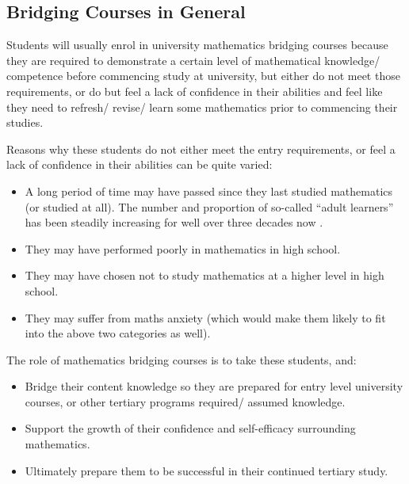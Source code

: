 \documentclass[twoside,12pt,a4paper]{report}
\begin{document}
\subsection{Bridging Courses in General}

Students will usually enrol in university mathematics bridging courses because they are required to demonstrate a certain level of mathematical knowledge/ competence before commencing study at university, but either do not meet those requirements, or do but feel a lack of confidence in their abilities and feel like they need to refresh/ revise/ learn some mathematics prior to commencing their studies.

Reasons why these students do not either meet the entry requirements, or feel a lack of confidence in their abilities can be quite varied:
\begin{itemize}
	\item A long period of time may have passed since they last studied mathematics (or studied at all). The number and proportion of so-called ``adult learners'' has been steadily increasing for well over three decades now \cite{Johnson2016, Hardin2008,Murtaugh1999}.
	\item They may have performed poorly in mathematics in high school.
	\item They may have chosen not to study mathematics at a higher level in high school.
	\item They may suffer from maths anxiety (which would make them likely to fit into the above two categories as well).
\end{itemize}
	
The role of mathematics bridging courses is to take these students, and:
\begin{itemize}
	\item Bridge their content knowledge so they are prepared for entry level university courses, or other tertiary programs required/ assumed knowledge.
	\item Support the growth of their confidence and self-efficacy surrounding mathematics.
	\item Ultimately prepare them to be successful in their continued tertiary study.
\end{itemize}
\end{document}
